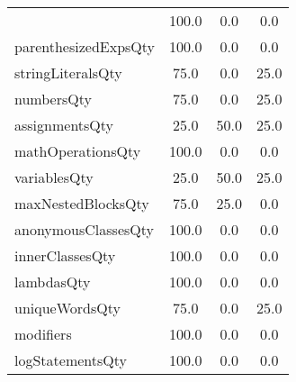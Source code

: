 \begin{tabular}{lccc}
{tryCatchQty & 100.0 & 0.0 & 0.0 \\
parenthesizedExpsQty & 100.0 & 0.0 & 0.0 \\
stringLiteralsQty & 75.0 & 0.0 & 25.0 \\
numbersQty & 75.0 & 0.0 & 25.0 \\
assignmentsQty & 25.0 & 50.0 & 25.0 \\
mathOperationsQty & 100.0 & 0.0 & 0.0 \\
variablesQty & 25.0 & 50.0 & 25.0 \\
maxNestedBlocksQty & 75.0 & 25.0 & 0.0 \\
anonymousClassesQty & 100.0 & 0.0 & 0.0 \\
innerClassesQty & 100.0 & 0.0 & 0.0 \\
lambdasQty & 100.0 & 0.0 & 0.0 \\
uniqueWordsQty & 75.0 & 0.0 & 25.0 \\
modifiers & 100.0 & 0.0 & 0.0 \\
logStatementsQty & 100.0 & 0.0 & 0.0 \\
\bottomrule
              \end{tabular}
            